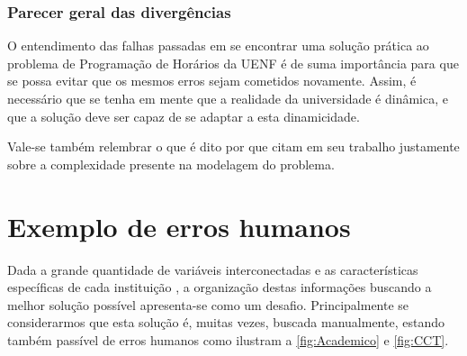 \subsubsection*{Parecer geral das divergências} \label{subsubsec:divergencias} %

O entendimento das falhas passadas em se encontrar uma solução prática ao problema de Programação de Horários da UENF é de suma importância para que se possa evitar que os mesmos erros sejam cometidos novamente. Assim, é necessário que se tenha em mente que a realidade da universidade é dinâmica, e que a solução deve ser capaz de se adaptar a esta dinamicidade.

Vale-se também relembrar o que é dito por  que citam em seu trabalho justamente sobre a complexidade presente na modelagem do problema.

\section{Exemplo de erros humanos} \label{sec:erros}          %

Dada a grande quantidade de variáveis interconectadas e as características específicas de cada instituição \cite{miranda_udpskeduler_2012}, a organização destas informações buscando a melhor solução possível apresenta-se como um desafio. Principalmente se considerarmos que esta solução é, muitas vezes, buscada manualmente, estando também passível de erros humanos como ilustram a \autoref{fig:Academico} e \autoref{fig:CCT}.

